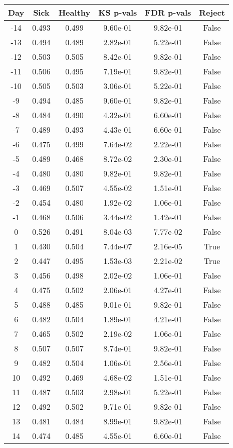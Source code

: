 \begin{tabular}{c|c|c|c|c|c}
Day &  Sick & Healthy &  KS p-vals & FDR p-vals & Reject\\
\hline
-14 & 0.493 &   0.499 &   9.60e-01 &   9.82e-01 &  False\\
-13 & 0.494 &   0.489 &   2.82e-01 &   5.22e-01 &  False\\
-12 & 0.503 &   0.505 &   8.42e-01 &   9.82e-01 &  False\\
-11 & 0.506 &   0.495 &   7.19e-01 &   9.82e-01 &  False\\
-10 & 0.505 &   0.503 &   3.06e-01 &   5.22e-01 &  False\\
 -9 & 0.494 &   0.485 &   9.60e-01 &   9.82e-01 &  False\\
 -8 & 0.484 &   0.490 &   4.32e-01 &   6.60e-01 &  False\\
 -7 & 0.489 &   0.493 &   4.43e-01 &   6.60e-01 &  False\\
 -6 & 0.475 &   0.499 &   7.64e-02 &   2.22e-01 &  False\\
 -5 & 0.489 &   0.468 &   8.72e-02 &   2.30e-01 &  False\\
 -4 & 0.480 &   0.480 &   9.82e-01 &   9.82e-01 &  False\\
 -3 & 0.469 &   0.507 &   4.55e-02 &   1.51e-01 &  False\\
 -2 & 0.454 &   0.480 &   1.92e-02 &   1.06e-01 &  False\\
 -1 & 0.468 &   0.506 &   3.44e-02 &   1.42e-01 &  False\\
  0 & 0.526 &   0.491 &   8.04e-03 &   7.77e-02 &  False\\
  1 & 0.430 &   0.504 &   7.44e-07 &   2.16e-05 &   True\\
  2 & 0.447 &   0.495 &   1.53e-03 &   2.21e-02 &   True\\
  3 & 0.456 &   0.498 &   2.02e-02 &   1.06e-01 &  False\\
  4 & 0.475 &   0.502 &   2.06e-01 &   4.27e-01 &  False\\
  5 & 0.488 &   0.485 &   9.01e-01 &   9.82e-01 &  False\\
  6 & 0.482 &   0.504 &   1.89e-01 &   4.21e-01 &  False\\
  7 & 0.465 &   0.502 &   2.19e-02 &   1.06e-01 &  False\\
  8 & 0.507 &   0.507 &   8.74e-01 &   9.82e-01 &  False\\
  9 & 0.482 &   0.504 &   1.06e-01 &   2.56e-01 &  False\\
 10 & 0.492 &   0.469 &   4.68e-02 &   1.51e-01 &  False\\
 11 & 0.487 &   0.503 &   2.98e-01 &   5.22e-01 &  False\\
 12 & 0.492 &   0.502 &   9.71e-01 &   9.82e-01 &  False\\
 13 & 0.481 &   0.484 &   8.99e-01 &   9.82e-01 &  False\\
 14 & 0.474 &   0.485 &   4.55e-01 &   6.60e-01 &  False\\
\end{tabular}